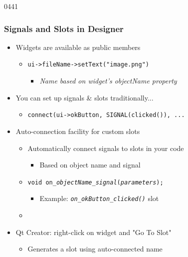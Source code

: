 \begin{slide}{0441}\frametitle{Signals and Slots in Designer}
  \begin{itemize}
  \item Widgets are available as public members
    \begin{itemize}
    \item \texttt{ui->fileName->setText("image.png")}
      \begin{itemize}
      \item \textit{Name based on widget's objectName property}
      \end{itemize}
    \end{itemize}
  \item You can set up signals \& slots traditionally...
    \begin{itemize}
    \item \texttt{connect(ui->okButton, SIGNAL(clicked()), ...}
    \end{itemize}
  \end{itemize}
  \begin{itemize}
  \item Auto-connection facility for custom slots
    \begin{itemize}
    \item Automatically connect signals to slots in your code
      \begin{itemize}
      \item Based on object name and signal 
      \end{itemize}
    \item \texttt{void on\_\emph{objectName}\_\emph{signal}(\emph{parameters});}
      \begin{itemize}
      \item Example: \textit{\texttt{on\_okButton\_clicked()}} slot
      \end{itemize}
    \item {}
    \end{itemize}
  \end{itemize}
  \begin{itemize}
  \item Qt Creator: right-click on widget and "Go To Slot"
    \begin{itemize}
    \item Generates a slot using auto-connected name
    \end{itemize}
  \end{itemize}

\end{slide}



